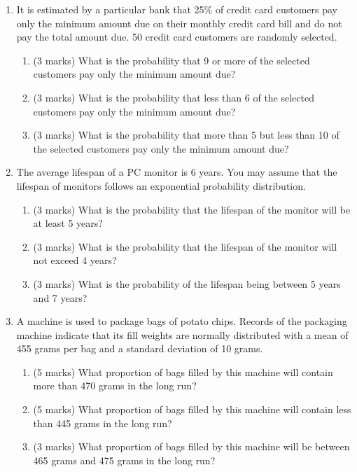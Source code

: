 \documentclass[a4paper,12pt]{article}
\begin{document}
\begin{enumerate}
\begin{enumerate}
\vspace{0.25cm}


\item It is estimated by a particular bank that 25\% of credit card customers pay only the minimum amount due on their monthly credit card bill and do not pay the total amount due. 50 credit card customers are randomly selected.
\begin{enumerate}
\item (3 marks)	What is the probability that 9 or more of the selected customers pay only the minimum amount due?
\item (3 marks) What is the probability that less than 6 of the selected customers pay only the minimum amount due?
\item (3 marks)	What is the probability that more than 5 but less than 10 of the selected customers pay only the minimum amount due?
\end{enumerate}



\vspace{0.25cm}
\item The average lifespan of a PC monitor is 6 years. You may assume that the lifespan of monitors follows an exponential probability distribution.
    \begin{enumerate}
    \item (3 marks) What is the probability that the lifespan of the monitor will be at least 5 years?
    \item (3 marks) What is the probability that the lifespan of the monitor will not exceed 4 years?
    \item (3 marks) What is the probability of the lifespan being between 5 years and 7 years?
    \end{enumerate}
\vspace{0.25cm}
\item A machine is used to package bags of potato chips.  Records of the packaging machine indicate that its fill weights are normally distributed with a mean of 455 grams per bag and a standard deviation of 10 grams.

    \begin{enumerate}
    \item (5 marks) What proportion of bags filled by this machine will contain more than 470 grams in the long run?
    \item (5 marks)	What proportion of bags filled by this machine will contain less than 445 grams in the long run?
    \item (3 marks)	What proportion of bags filled by this machine will be between 465 grams and 475 grams in the long run?
    \end{enumerate}
\end{enumerate}



\end{enumerate}
\newpage
\end{document}
